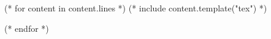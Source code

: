 \begin{(( content.type ))}
    (* for content in content.lines *)
        (* include content.template("tex") *)

    (* endfor *)
\end{(( content.type ))}

